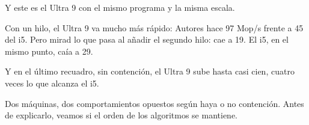 Y este es el Ultra 9 con el mismo programa y la misma escala.

Con un hilo, el Ultra 9 va mucho más rápido: Autores hace 97 Mop/s frente a 45 del i5. Pero mirad lo que pasa al añadir el segundo hilo: cae a 19. El i5, en el mismo punto, caía a 29.

Y en el último recuadro, sin contención, el Ultra 9 sube hasta casi cien, cuatro veces lo que alcanza el i5.

Dos máquinas, dos comportamientos opuestos según haya o no contención. Antes de explicarlo, veamos si el orden de los algoritmos se mantiene.
